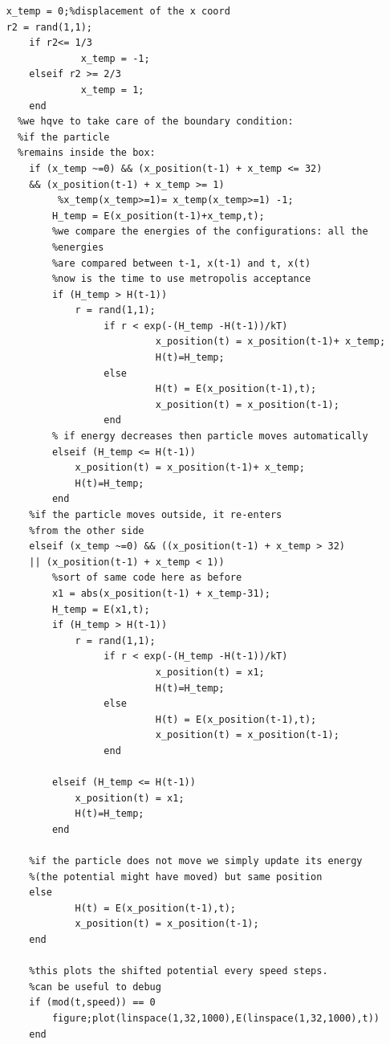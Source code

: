 \documentclass[11pt,letterpaper]{article}
\begin{document}
\begin{lstlisting}
    x_temp = 0;%displacement of the x coord
    r2 = rand(1,1);
        if r2<= 1/3
                 x_temp = -1;
        elseif r2 >= 2/3
                 x_temp = 1;
        end 
      %we hqve to take care of the boundary condition: 
      %if the particle
      %remains inside the box:
        if (x_temp ~=0) && (x_position(t-1) + x_temp <= 32) 
        && (x_position(t-1) + x_temp >= 1)
             %x_temp(x_temp>=1)= x_temp(x_temp>=1) -1;
            H_temp = E(x_position(t-1)+x_temp,t);  
            %we compare the energies of the configurations: all the
            %energies
            %are compared between t-1, x(t-1) and t, x(t)
            %now is the time to use metropolis acceptance
            if (H_temp > H(t-1))
                r = rand(1,1);
                     if r < exp(-(H_temp -H(t-1))/kT)
                              x_position(t) = x_position(t-1)+ x_temp;
                              H(t)=H_temp;
                     else
                              H(t) = E(x_position(t-1),t);
                              x_position(t) = x_position(t-1);
                     end
            % if energy decreases then particle moves automatically         
            elseif (H_temp <= H(t-1))
                x_position(t) = x_position(t-1)+ x_temp;
                H(t)=H_temp;
            end
        %if the particle moves outside, it re-enters 
        %from the other side    
        elseif (x_temp ~=0) && ((x_position(t-1) + x_temp > 32) 
        || (x_position(t-1) + x_temp < 1))
            %sort of same code here as before
            x1 = abs(x_position(t-1) + x_temp-31);
            H_temp = E(x1,t);    
            if (H_temp > H(t-1))
                r = rand(1,1);
                     if r < exp(-(H_temp -H(t-1))/kT)
                              x_position(t) = x1;
                              H(t)=H_temp;
                     else
                              H(t) = E(x_position(t-1),t);
                              x_position(t) = x_position(t-1);
                     end
                     
            elseif (H_temp <= H(t-1))
                x_position(t) = x1;
                H(t)=H_temp;
            end
            
        %if the particle does not move we simply update its energy 
        %(the potential might have moved) but same position    
        else
                H(t) = E(x_position(t-1),t); 
                x_position(t) = x_position(t-1);
        end 
        
        %this plots the shifted potential every speed steps. 
        %can be useful to debug
        if (mod(t,speed)) == 0
            figure;plot(linspace(1,32,1000),E(linspace(1,32,1000),t))
        end
        

\end{lstlisting}
\end{document}
